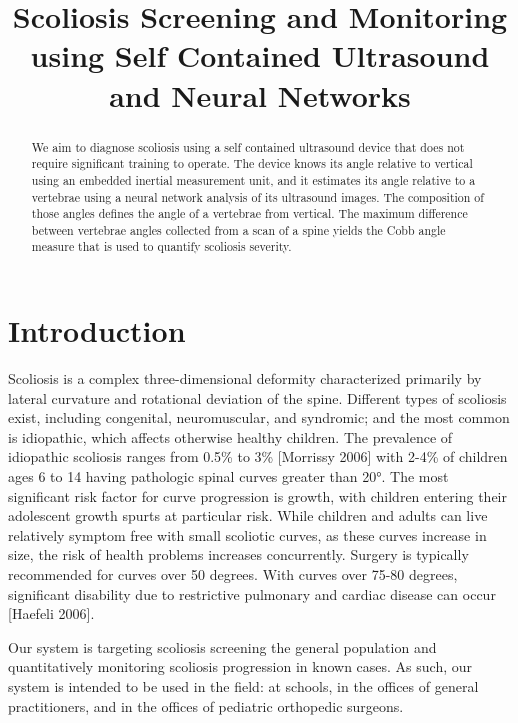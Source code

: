 \documentclass{article}
\title{Scoliosis Screening and Monitoring using Self Contained Ultrasound and Neural Networks}
\begin{document}
%
\maketitle
%
\begin{abstract}
We aim to diagnose scoliosis using a self contained ultrasound device that does not require significant training to operate. The device knows its angle relative to vertical using an embedded inertial measurement unit, and it estimates its angle relative to a vertebrae using a neural network analysis of its ultrasound images.  The composition of those angles defines the angle of a vertebrae from vertical.  The maximum difference between vertebrae angles collected from a scan of a spine yields the Cobb angle measure that is used to quantify scoliosis severity. 
\end{abstract}
%
\begin{keywords}
\end{keywords}
%
\section{Introduction}
\label{sec:intro}

Scoliosis is a complex three-dimensional deformity characterized primarily by lateral curvature and rotational deviation of the spine. Different types of scoliosis exist, including congenital, neuromuscular, and syndromic; and the most common is idiopathic, which affects otherwise healthy children. The prevalence of idiopathic scoliosis ranges from 0.5\% to 3\% [Morrissy 2006] with 2-4\% of children ages 6 to 14 having pathologic spinal curves greater than 20°. The most significant risk factor for curve progression is growth, with children entering their adolescent growth spurts at particular risk. While children and adults can live relatively symptom free with small scoliotic curves, as these curves increase in size, the risk of health problems increases concurrently. Surgery is typically recommended for curves over 50 degrees. With curves over 75-80 degrees, significant disability due to restrictive pulmonary and cardiac disease can occur [Haefeli 2006].

Our system is targeting scoliosis screening the general population and quantitatively monitoring scoliosis progression in known cases. As such, our system is intended to be used in the field: at schools, in the offices of general practitioners, and in the offices of pediatric orthopedic surgeons.
\end{document}

